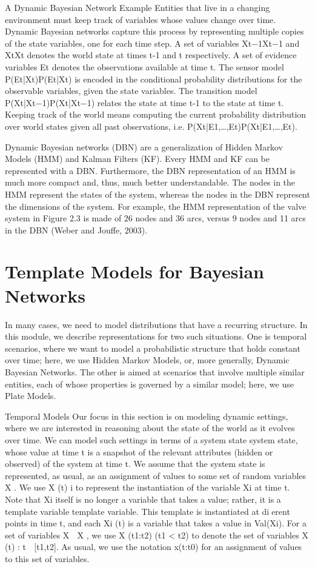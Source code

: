 A Dynamic Bayesian Network Example
Entities that live in a changing environment must keep track of variables whose values change over time. Dynamic Bayesian networks capture this process by representing multiple copies of the state variables, one for each time step. A set of variables Xt−1Xt−1 and XtXt denotes the world state at times t-1 and t respectively. A set of evidence variables Et denotes the observations available at time t. The sensor model P(Et|Xt)P(Et|Xt) is encoded in the conditional probability distributions for the observable variables, given the state variables. The transition model P(Xt|Xt−1)P(Xt|Xt−1) relates the state at time t-1 to the state at time t. Keeping track of the world means computing the current probability distribution over world states given all past observations, i.e. P(Xt|E1,…,Et)P(Xt|E1,…,Et).

Dynamic Bayesian networks (DBN) are a generalization of Hidden Markov Models (HMM) and Kalman Filters (KF). Every HMM and KF can be represented with a DBN. Furthermore, the DBN representation of an HMM is much more compact and, thus, much better understandable. The nodes in the HMM represent the states of the system, whereas the nodes in the DBN represent the dimensions of the system. For example, the HMM representation of the valve system in Figure 2.3 is made of 26 nodes and 36 arcs, versus 9 nodes and 11 arcs in the DBN (Weber and Jouffe, 2003).

\section{Template Models for Bayesian Networks}

In many cases, we need to model distributions that have a recurring structure. In this module, we describe representations for two such situations. One is temporal scenarios, where we want to model a probabilistic structure that holds constant over time; here, we use Hidden Markov Models, or, more generally, Dynamic Bayesian Networks. The other is aimed at scenarios that involve multiple similar entities, each of whose properties is governed by a similar model; here, we use Plate Models.

Temporal Models
Our focus in this section is on modeling dynamic settings, where we are interested in reasoning about the state of the world as it evolves over time. We can model such settings in terms of a system state system state, whose value at time t is a snapshot of the relevant attributes (hidden or observed) of the system at time t. We assume that the system state is represented, as usual, as an assignment of values to some set of random variables X . We use X (t) i to represent the instantiation of the variable Xi at time t. Note that Xi itself is no longer a variable that takes a value; rather, it is a template variable template variable. This template is instantiated at dierent points in time t, and each Xi (t) is a variable that takes a value in Val(Xi). For a set of variables X ⊆ X , we use X (t1:t2) (t1 < t2) to denote the set of variables {X (t) : t ∈ [t1,t2]}. As usual, we use the notation x(t:t0) for an assignment of values to this set of variables.

